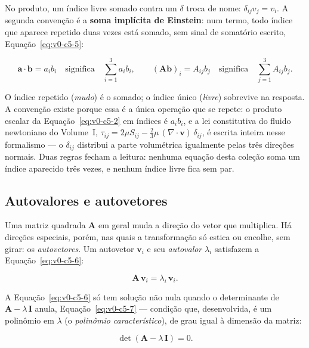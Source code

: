 \documentclass[12pt,a4paper]{article}
\numberwithin{equation}{section}
\numberwithin{table}{section}
\numberwithin{figure}{section}
\begin{document}
No produto, um índice livre somado contra um $\delta$ troca de nome:
$\delta_{ij}v_j = v_i$. A segunda convenção é a \textbf{soma implícita de
Einstein}: num termo, todo índice que aparece repetido duas vezes está
somado, sem sinal de somatório escrito, Equação~\eqref{eq:v0-c5-5}:

\begin{equation}\label{eq:v0-c5-5}
\bm{a}\cdot\bm{b} = a_i b_i
\quad\text{significa}\quad
\sum_{i=1}^{3} a_i b_i,
\qquad
(\bm{A}\bm{b})_i = A_{ij} b_j
\quad\text{significa}\quad
\sum_{j=1}^{3} A_{ij} b_j.
\end{equation}

O índice repetido (\emph{mudo}) é o somado; o índice único (\emph{livre})
sobrevive na resposta. A convenção existe porque essa é a única operação
que se repete: o produto escalar da Equação~\eqref{eq:v0-c5-2} em índices
é $a_i b_i$, e a lei constitutiva do fluido newtoniano do Volume~I,
$\tau_{ij} = 2\mu S_{ij} - \tfrac{2}{3}\mu\,(\nabla\cdot\bm{v})\,\delta_{ij}$,
é escrita inteira nesse formalismo --- o $\delta_{ij}$ distribui a parte
volumétrica igualmente pelas três direções normais. Duas regras fecham a
leitura: nenhuma equação desta coleção soma um índice aparecido três
vezes, e nenhum índice livre fica sem par.

\subsection{Autovalores e autovetores}

Uma matriz quadrada $\bm{A}$ em geral muda a direção do vetor que
multiplica. Há direções especiais, porém, nas quais a transformação só
estica ou encolhe, sem girar: os \emph{autovetores}. Um autovetor
$\bm{v}_i$ e seu \emph{autovalor} $\lambda_i$ satisfazem a
Equação~\eqref{eq:v0-c5-6}:

\begin{equation}\label{eq:v0-c5-6}
\bm{A}\,\bm{v}_i = \lambda_i\,\bm{v}_i.
\end{equation}

A Equação~\eqref{eq:v0-c5-6} só tem solução não nula quando o
determinante de $\bm{A} - \lambda\,\bm{I}$ anula, Equação~\eqref{eq:v0-c5-7}
--- condição que, desenvolvida, é um polinômio em $\lambda$ (o
\emph{polinômio característico}), de grau igual à dimensão da matriz:

\begin{equation}\label{eq:v0-c5-7}
\det(\bm{A} - \lambda\,\bm{I}) = 0.
\end{equation}
\end{document}
